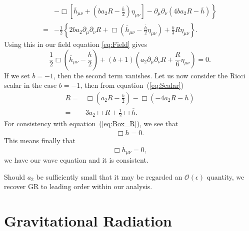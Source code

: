 \documentclass[a4paper, 11pt, titlepage, twoside]{report}
\newcommand{\eqnref}[1]{equation~(\ref{eq:#1})}
\newcommand{\order}[1]{\ensuremath{\mathcal{O}({#1})}}
\begin{document}
{\begin{align}
 & \left. - \Box \left[\overline{h}_{\mu\nu} + \left(b a_2 R -\frac{\overline{h}}{2}\right)\eta_{\mu\nu}\right] - \partial_\mu\partial_\nu (4b a_2 R - \overline{h})\right\} \nonumber \\
 = {} & -\frac{1}{2}\left\{2b a_2 \partial_\mu\partial_\nu R + \Box\left(\overline{h}_{\mu\nu} -\frac{\overline{h}}{2}\eta_{\mu\nu}\right) + \frac{b}{3}R\eta_{\mu\nu}\right\}.
\end{align}
Using this in our field equation \eqref{eq:Field} gives
\begin{equation}
\frac{1}{2}\Box\left(\overline{h}_{\mu\nu} - \frac{\overline{h}}{2}\right) + (b + 1)\left(a_2\partial_\mu\partial_\nu R + \frac{R}{6}\eta_{\mu\nu}\right) = 0.
\end{equation}
If we set $b = -1$, then the second term vanishes. Let us now consider the Ricci scalar in the case $b = -1$, then from \eqnref{Scalar}
\begin{align}
R = {} & \Box \left(a_2 R -\frac{\overline{h}}{2}\right) - \Box (-4 a_2 R - \overline{h}) \nonumber \\
 = {} & 3a_2 \Box R + \frac{1}{2}\Box \overline{h}.
\label{eq:Ricci_Box_h}
\end{align}
For consistency with \eqnref{Box_R}, we see that
\begin{equation}
\Box \overline{h} = 0.
\label{eq:Box_h}
\end{equation}
This means finally that
\begin{equation}
\Box \overline{h}_{\mu\nu} = 0,
\label{eq:Box_hmunu}
\end{equation}
we have our wave equation and it is consistent.

Should $a_2$ be sufficiently small that it may be regarded an $\order{\epsilon}$ quantity, we recover GR to leading order within our analysis.

\section{Gravitational Radiation}

}
\end{document}
